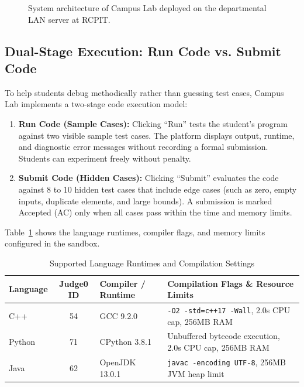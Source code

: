 \documentclass[12pt,a4paper]{article}
\begin{document}
\begin{figure}[!htbp]
\caption{System architecture of Campus Lab deployed on the departmental LAN server at RCPIT.}
\label{fig:architecture}
\end{figure}

\subsection{Dual-Stage Execution: Run Code vs. Submit Code}
To help students debug methodically rather than guessing test cases, Campus Lab implements a two-stage code execution model:
\begin{enumerate}[leftmargin=1.5em, itemsep=1.5pt]
    \item \textbf{Run Code (Sample Cases):} Clicking ``Run'' tests the student's program against two visible sample test cases. The platform displays output, runtime, and diagnostic error messages without recording a formal submission. Students can experiment freely without penalty.
    \item \textbf{Submit Code (Hidden Cases):} Clicking ``Submit'' evaluates the code against 8 to 10 hidden test cases that include edge cases (such as zero, empty inputs, duplicate elements, and large bounds). A submission is marked Accepted (AC) only when all cases pass within the time and memory limits.
\end{enumerate}

Table~\ref{tab:runtimes} shows the language runtimes, compiler flags, and memory limits configured in the sandbox.

\begin{table}[!htbp]
\centering
\small
\caption{Supported Language Runtimes and Compilation Settings}
\label{tab:runtimes}
\begin{tabularx}{\linewidth}{|l|c|l|X|}
\hline
\textbf{Language} & \textbf{Judge0 ID} & \textbf{Compiler / Runtime} & \textbf{Compilation Flags \& Resource Limits} \\
\hline
C++ & 54 & GCC 9.2.0 & \texttt{-O2 -std=c++17 -Wall}, 2.0s CPU cap, 256MB RAM \\
\hline
Python & 71 & CPython 3.8.1 & Unbuffered bytecode execution, 2.0s CPU cap, 256MB RAM \\
\hline
Java & 62 & OpenJDK 13.0.1 & \texttt{javac -encoding UTF-8}, 256MB JVM heap limit \\
\hline
\end{tabularx}
\end{table}
\end{document}
